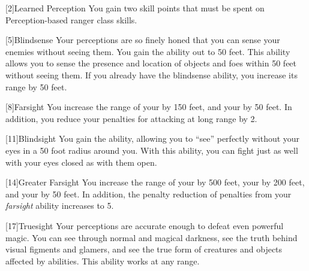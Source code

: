         [2]{Learned Perception} You gain two skill points that must be spent on Perception-based ranger class skills.

        [5]{Blindsense}
        Your perceptions are so finely honed that you can sense your enemies without seeing them.
        You gain the  ability out to 50 feet.
        This ability allows you to sense the presence and location of objects and foes within 50 feet without seeing them.
        If you already have the blindsense ability, you increase its range by 50 feet.

        [8]{Farsight}
        You increase the range of your  by 150 feet, and your  by 50 feet.
        In addition, you reduce your  penalties for attacking at long range by 2.

        [11]{Blindsight}
        You gain the  ability, allowing you to ``see'' perfectly without your eyes in a 50 foot radius around you.
        With this ability, you can fight just as well with your eyes closed as with them open.

        [14]{Greater Farsight}
        You increase the range of your  by 500 feet, your  by 200 feet, and your  by 50 feet.
        In addition, the penalty reduction of  penalties from your \textit{farsight} ability increases to 5.

        [17]{Truesight} 
        Your perceptions are accurate enough to defeat even powerful magic.
        You can see through normal and magical darkness, see the truth behind visual figments and glamers, and see the true form of creatures and objects affected by  abilities.
        This ability works at any range.

